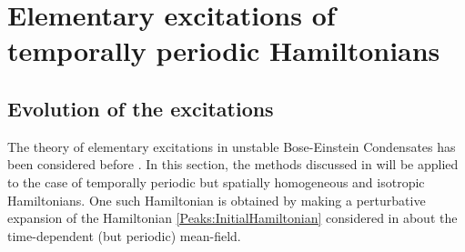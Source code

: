 \chapter{Elementary excitations of temporally periodic Hamiltonians}
\label{FloquetAppendix}
\graphicspath{{Figures/FloquetAppendix/}{Figures/Common/}}

\section{Evolution of the excitations}
\label{FloquetAppendix:Evolution}
The theory of elementary excitations in unstable Bose-Einstein Condensates has been considered before \citep{Leonhardt:2003}. In this section, the methods discussed in \citep{Leonhardt:2003} will be applied to the case of temporally periodic but spatially homogeneous and isotropic Hamiltonians. One such Hamiltonian is obtained by making a perturbative expansion of the Hamiltonian \eqref{Peaks:InitialHamiltonian} considered in  about the time-dependent (but periodic) mean-field.

